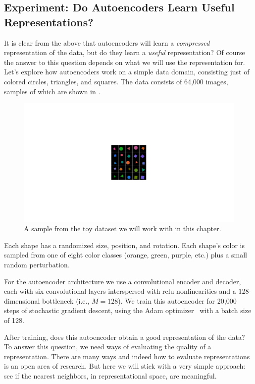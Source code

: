 \subsection{Experiment: Do Autoencoders Learn Useful Representations?}
It is clear from the above that autoencoders will learn a \textit{compressed} representation of the data, but do they learn a \textit{useful} representation? Of course the answer to this question depends on what we will use the representation for. Let's explore how autoencoders work on a simple data domain, consisting just of colored circles, triangles, and squares. The data consists of 64,000 images, samples of which are shown in \fig{\ref{fig:representation_learning:shapes_dataset_random_samples}}.
\begin{figure}[h!]
    \centerline{
        \includegraphics[width=0.275\linewidth]{figures/representation_learning/shapes_dataset_random_samples.pdf}
    }
    \caption{A sample from the toy dataset we will work with in this chapter.}
  \vspace{-1.0em}
  \label{fig:representation_learning:shapes_dataset_random_samples}
\end{figure}

Each shape has a randomized size, position, and rotation. Each shape's color is sampled from one of eight color classes (orange, green, purple, etc.) plus a small random perturbation.

For the autoencoder architecture we use a convolutional encoder and decoder, each with six convolutional layers interspersed with relu nonlinearities and a 128-dimensional bottleneck (i.e., $M=128$). We train this autoencoder for 20,000 steps of stochastic gradient descent, using the Adam optimizer~\cite{kingma2014adam} with a batch size of 128.

After training, does this autoencoder obtain a good representation of the data? To answer this question, we need ways of evaluating the quality of a representation. There are many ways and indeed how to evaluate representations is an open area of research. But here we will stick with a very simple approach: see if the nearest neighbors, in representational space, are meaningful.


